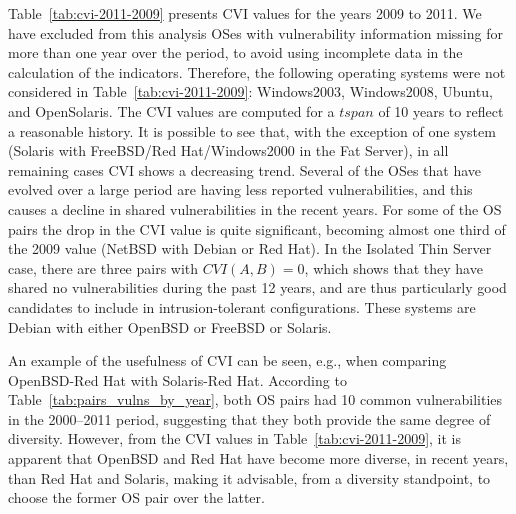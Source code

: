 Table~\ref{tab:cvi-2011-2009} presents CVI values for the years 2009 to 2011. We have excluded from this analysis OSes with vulnerability information missing for more than one year over the period, to avoid using incomplete data in the calculation of the indicators. Therefore, the following operating systems were not considered in Table~\ref{tab:cvi-2011-2009}: Windows2003, Windows2008, Ubuntu, and OpenSolaris. The CVI values are computed for a $\mathit{tspan}$ of 10 years to reflect a reasonable history. It is possible to see that, with the exception of one system (Solaris with FreeBSD/Red Hat/Windows2000 in the Fat Server), in all remaining cases CVI shows a decreasing trend. Several of the OSes that have evolved over a large period are having less reported vulnerabilities, and this causes a decline in shared vulnerabilities in the recent years. For some of the OS pairs the drop in the CVI value is quite significant, becoming almost one third of the 2009 value (NetBSD with Debian or Red Hat). In the Isolated Thin Server case, there are three pairs with $\mathit{CVI}(A,B)=0$, which shows that they have shared no vulnerabilities during the past 12 years, and are thus particularly good candidates to include in intrusion-tolerant configurations. These systems are Debian with either OpenBSD or FreeBSD or Solaris.

An example of the usefulness of CVI can be seen, e.g., when comparing OpenBSD-Red Hat with Solaris-Red Hat. According to Table~\ref{tab:pairs_vulns_by_year}, both OS pairs had 10 common vulnerabilities in the 2000--2011 period, suggesting that they both provide the same degree of diversity. However, from the CVI values in Table~\ref{tab:cvi-2011-2009}, it is apparent that OpenBSD and Red Hat have become more diverse, in recent years, than Red Hat and Solaris, making it advisable, from a diversity standpoint, to choose the former OS pair over the latter.

